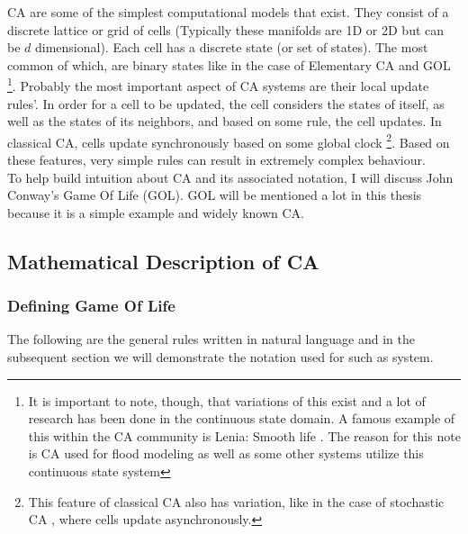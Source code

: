 CA are some of the simplest computational models that exist. They consist of a discrete lattice or grid of cells (Typically these manifolds are 1D or 2D but can be $d$ dimensional). Each cell has a discrete state (or set of states). The most common of which, are binary states like in the case of Elementary CA and GOL \footnote{It is important to note, though, that variations of this exist and a lot of research has been done in the continuous state domain. A famous example of this within the CA community is Lenia: Smooth life \cite{chan2018lenia}. The reason for this note is CA used for flood modeling as well as some other systems utilize this continuous state system}. Probably the most important aspect of CA systems are their local update rules'. In order for a cell to be updated, the cell considers the states of itself, as well as the states of its neighbors, and based on some rule, the cell updates. In classical CA, cells update synchronously based on some global clock \footnote{This feature of classical CA also has variation, like in the case of stochastic CA \cite{fates2013stochastic}, where cells update asynchronously.}. Based on these features, very simple rules can result in extremely complex behaviour. \\
To help build intuition about CA and its associated notation, I will discuss John Conway's Game Of Life (GOL). GOL will be mentioned a lot in this thesis because it is a simple example and widely known CA.

\subsection{Mathematical Description of CA}

\subsubsection*{Defining Game Of Life}
The following are the general rules written in natural language and in the subsequent section we will demonstrate the notation used for such as system.

